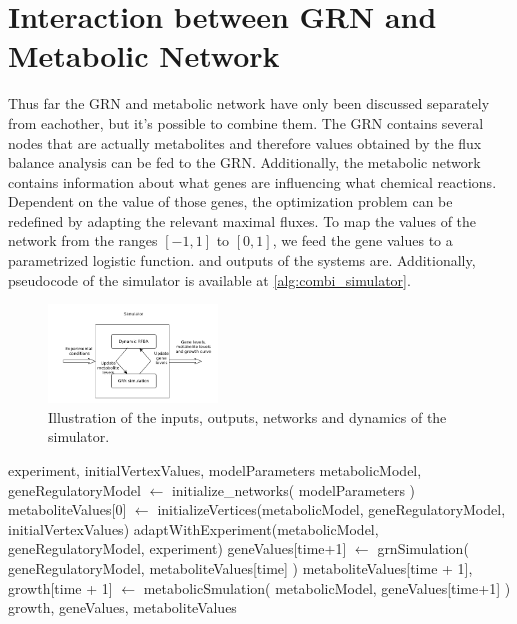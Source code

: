 \section{Interaction between GRN and Metabolic Network}\label{sec:fba}
Thus far the GRN and metabolic network have only been discussed separately from eachother, but it's possible to combine
them. The GRN contains several nodes that are actually metabolites and therefore values obtained by the flux balance analysis
can be fed to the GRN. Additionally, the metabolic network contains information about what genes are influencing what
chemical reactions. Dependent on the value of those genes, the optimization problem can be redefined by adapting the 
relevant maximal fluxes. 
To map the values of the network from the ranges $[-1,1]$ to $[0,1]$, we feed the gene values to a parametrized logistic function.
and outputs of the systems are. Additionally, pseudocode of the simulator is available at \ref{alg:combi_simulator}.
\begin{figure}	
    \centering
    \includegraphics[width=0.4\textwidth]{images/simulator.png}
    \caption{ Illustration of the inputs, outputs, networks and dynamics of the simulator. }
    \label{fig:simulator}
\end{figure}
\begin{algorithmic}\label{alg:combi_simulator}
  \Require experiment, initialVertexValues, modelParameters
  \State metabolicModel, geneRegulatoryModel $\leftarrow$ initialize\_networks( modelParameters )
  \State metaboliteValues[0] $\leftarrow$ initializeVertices(metabolicModel, geneRegulatoryModel, initialVertexValues)
  \State adaptWithExperiment(metabolicModel, geneRegulatoryModel, experiment)
  \State geneValues[time+1] $\leftarrow$ grnSimulation( geneRegulatoryModel, metaboliteValues[time] )
  \State metaboliteValues[time + 1], growth[time + 1] $\leftarrow$ metabolicSmulation( metabolicModel, geneValues[time+1] )
  \EndFor \\
  \Return growth, geneValues, metaboliteValues
  
  \EndFunction 
\end{algorithmic} 


